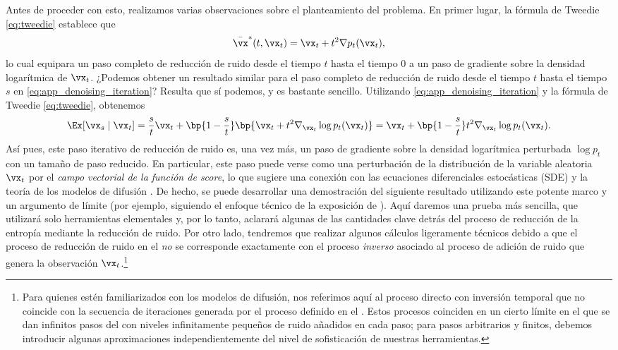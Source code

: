\documentclass[../../book-main_es.tex]{subfiles}
\begin{document}
Antes de proceder con esto, realizamos varias observaciones sobre el
planteamiento del problema. En primer lugar, la fórmula de Tweedie \eqref{eq:tweedie} establece que
\begin{equation}
    \bar{\vx}^{\ast}(t, \vx_{t}) = \vx_{t} + t^{2}\nabla p_{t}(\vx_{t}),
\end{equation}
lo cual equipara un paso completo de reducción de ruido desde el tiempo \(t\) hasta el tiempo \(0\) a un
paso de gradiente sobre la densidad logarítmica de \(\vx_{t}\). ¿Podemos obtener un resultado similar
para el paso completo de reducción de ruido desde el tiempo \(t\) hasta el tiempo \(s\) en
\eqref{eq:app_denoising_iteration}? Resulta que sí podemos,
y es bastante sencillo. Utilizando \eqref{eq:app_denoising_iteration}
y la fórmula de Tweedie \eqref{eq:tweedie}, obtenemos
\begin{equation}\label{eq:app_denoising_iteration_score}
    \Ex[\vx_{s} \mid \vx_{t}] = \frac{s}{t}\vx_{t} + \bp{1 -
    \frac{s}{t}}\bp{\vx_{t} + t^{2}\nabla_{\vx_{t}}\log
    p_{t}(\vx_{t})} = \vx_{t} + \bp{1 -
    \frac{s}{t}}t^{2}\nabla_{\vx_{t}}\log p_{t}(\vx_{t}).
\end{equation}
Así pues, este paso iterativo de reducción de ruido es, una vez más, un paso de gradiente sobre la
densidad logarítmica perturbada \(\log p_{t}\) con un tamaño de paso reducido. En
particular, este paso puede verse como una perturbación de la
distribución de la variable aleatoria \(\vx_{t}\) por el \textit{campo vectorial de la función de \textit{score}}, 
lo que sugiere una conexión con las ecuaciones diferenciales estocásticas
(SDE) y la teoría de los modelos de difusión
\cite{song2020score}. De hecho, se puede desarrollar una demostración del siguiente resultado
 utilizando este
potente marco y un argumento de límite (por ejemplo, siguiendo el
    enfoque técnico de la exposición de
\cite{DBLP:conf/iclr/ChenC0LSZ23}). Aquí daremos una prueba más sencilla,
que utilizará solo herramientas elementales y, por lo tanto, aclarará
algunas de las cantidades clave detrás del proceso de reducción de la entropía
mediante la reducción de ruido. Por otro lado, tendremos que realizar algunos
cálculos ligeramente técnicos debido a que el proceso de reducción de ruido
en el  \textit{no}
se corresponde exactamente con el proceso \textit{inverso} asociado al
proceso de adición de ruido que genera la observación
\(\vx_{t}\).\footnote{Para quienes estén familiarizados con los modelos de difusión, nos
    referimos aquí al proceso directo con inversión temporal que no coincide con
    la secuencia de iteraciones generada por el proceso definido en el
    . Estos procesos coinciden en
    un cierto límite en el que se dan infinitos pasos del
     con niveles infinitamente
    pequeños de ruido añadidos en cada paso; para pasos arbitrarios y finitos,
    debemos introducir algunas aproximaciones independientemente del nivel de
sofisticación de nuestras herramientas.}
\end{document}
